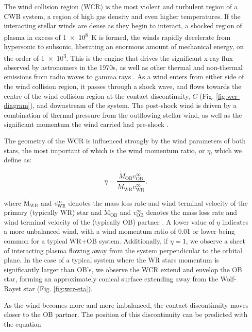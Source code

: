 \noindent
The wind collision region (WCR) is the most violent and turbulent region of a CWB system, a region of high gas density and even higher temperatures.
If the interacting stellar winds are dense as they begin to interact, a shocked region of plasma in excess of \SI{1e8}{\kelvin} is formed, the winds rapidly decelerate from hypersonic to subsonic, liberating an enormous amount of mechanical energy, on the order of \SI{1e3}{\solarluminosity}.
This is the engine that drives the significant x-ray flux observed by astronomers in the 1970s, as well as other thermal and non-thermal emissions from radio waves to gamma rays
\parencite{eichler_particle_1993,grimaldoProtonAccelerationColliding2019}.
As a wind enters from either side of the wind collision region, it passes through a shock wave, and flows towards the centre of the wind collision region at the contact discontinuity, $C$ (Fig. \ref{fig:wcr-diagram}), and downstream of the system.
The post-shock wind is driven by a combination of thermal pressure from the outflowing stellar wind, as well as the significant momentum the wind carried had pre-shock \parencite{stevens_colliding_1992}.

The geometry of the WCR is influenced strongly by the wind parameters of both stars, the most important of which is the wind momentum ratio, or $\eta$, which we define as:

\begin{equation}
  \eta = \frac{\dot M_\text{OB} v^\infty_\text{OB}}{\dot M_\text{WR} v^\infty_\text{WR}},
\end{equation}

\noindent
where $\dot{\text{M}}_\text{WR}$ and $v^{\infty}_\text{WR}$ denotes the mass loss rate and wind terminal velocity of the primary (typically WR) star and $\dot{\text{M}}_\text{OB}$ and $v^{\infty}_\text{OB}$ denotes the mass loss rate and wind terminal velocity of the (typically OB) partner \parencite{usov_stellar_1991}.
A lower value of $\eta$ indicates a more unbalanced wind, with a wind momentum ratio of \num{0.01} or lower being common for a typical WR+OB system.
Additionally, if $\eta = 1$, we observe a sheet of interacting plasma flowing away from the system perpendicular to the orbital plane.
In the case of a typical system where the WR stars momentum is significantly larger than OB's, we observe the WCR extend and envelop the OB star, forming an approximately conical surface extending away from the Wolf-Rayet star (Fig. \ref{fig:wcr-eta}).


As the wind becomes more and more imbalanced, the contact discontinuity moves closer to the OB partner.
The position of this discontinuity can be predicted with the equation

